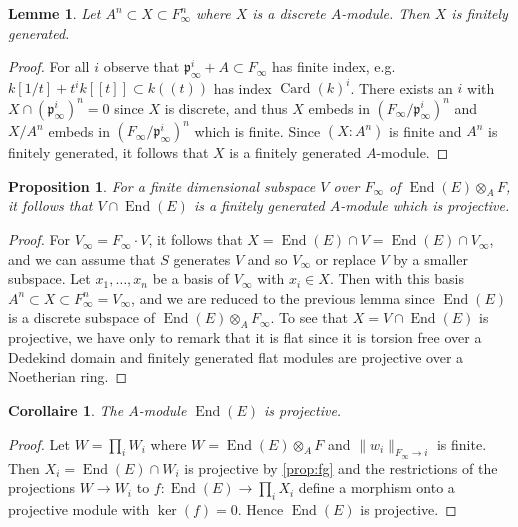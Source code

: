\documentclass[12pt,a4paper]{article}
\theoremstyle{plain}
\newtheorem{lemma}{Lemme}[section]
\newtheorem{proposition}{Proposition}[section]
\newtheorem{corollary}{Corollaire}[section]
\theoremstyle{definition}
\theoremstyle{remark}
\DeclareMathOperator{\End}{End}
\DeclareMathOperator{\Card}{Card}
\newcommand{\fp}{\mathfrak{p}}
\providecommand{\End}{\operatorname{End}}
\providecommand{\fp}{\mathfrak{p}}
\begin{document}
\begin{lemma}
\label{lem:fg}
Let $A^n \subset X \subset F_\infty^n$ where $X$ is a discrete $A$-module. Then $X$ is finitely generated.
\end{lemma}

\begin{proof}
For all $i$ observe that $\fp_\infty^i + A \subset F_\infty$ has finite index, e.g. $k[1/t] + t^i k[[t]] \subset k((t))$ has index $\Card(k)^i$. There exists an $i$ with $X \cap (\fp_\infty^i)^n = 0$ since $X$ is discrete, and thus $X$ embeds in $(F_\infty/\fp_\infty^i)^n$ and $X/A^n$ embeds in $(F_\infty/\fp_\infty^i)^n$ which is finite. Since $(X : A^n)$ is finite and $A^n$ is finitely generated, it follows that $X$ is a finitely generated $A$-module.
\end{proof}

\begin{proposition}
\label{prop:fg}
For a finite dimensional subspace $V$ over $F_\infty$ of $\End(E) \otimes_A F$, it follows that $V \cap \End(E)$ is a finitely generated $A$-module which is projective.
\end{proposition}

\begin{proof}
For $V_\infty = F_\infty \cdot V$, it follows that $X = \End(E) \cap V = \End(E) \cap V_\infty$, and we can assume that $S$ generates $V$ and so $V_\infty$ or replace $V$ by a smaller subspace. Let $x_1, \ldots, x_n$ be a basis of $V_\infty$ with $x_i \in X$. Then with this basis $A^n \subset X \subset F_\infty^n = V_\infty$, and we are reduced to the previous lemma since $\End(E)$ is a discrete subspace of $\End(E) \otimes_A F_\infty$. To see that $X = V \cap \End(E)$ is projective, we have only to remark that it is flat since it is torsion free over a Dedekind domain and finitely generated flat modules are projective over a Noetherian ring.
\end{proof}

\begin{corollary}
\label{cor:projective}
The $A$-module $\End(E)$ is projective.
\end{corollary}

\begin{proof}
Let $W = \prod_i W_i$ where $W = \End(E) \otimes_A F$ and $\|w_i\|_{F_\infty \to i}$ is finite. Then $X_i = \End(E) \cap W_i$ is projective by \eqref{prop:fg} and the restrictions of the projections $W \to W_i$ to $f: \End(E) \to \prod_i X_i$ define a morphism onto a projective module with $\ker(f) = 0$. Hence $\End(E)$ is projective.
\end{proof}
\end{document}
